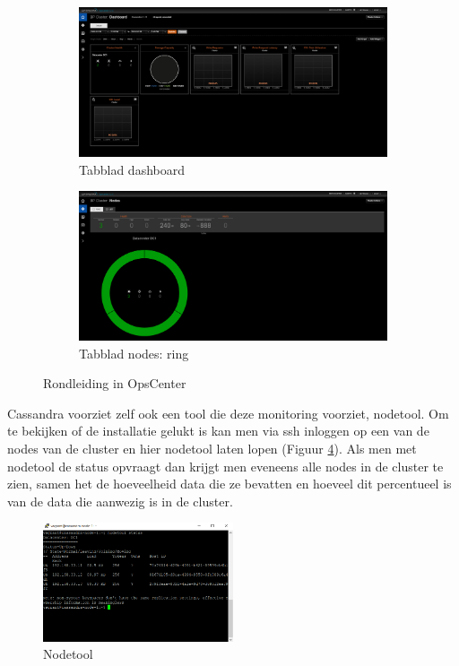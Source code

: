 \begin{figure}[H]
	\centering
	\begin{subfigure}{.49\textwidth}
		\centering
		\includegraphics[width=.99\linewidth]{img/4_installatie_cassandra/2_Tour_1_Dashboard}
		\caption{Tabblad dashboard}
		\label{fig:cas_opscenter_tour_dashboard}
	\end{subfigure}
	\begin{subfigure}{.49\textwidth}
		\centering
		\includegraphics[width=.99\linewidth]{img/4_installatie_cassandra/2_Tour_2_Nodes}
		\caption{Tabblad nodes: ring}
		\label{fig:cas_opscenter_tour_nodes}
	\end{subfigure}
	\caption{Rondleiding in OpsCenter}
	\label{fig:cas_opscenter_tour}
\end{figure}

Cassandra voorziet zelf ook een tool die deze monitoring voorziet, nodetool.
Om te bekijken of de installatie gelukt is kan men via ssh inloggen op een van de nodes van de cluster en hier nodetool laten lopen (Figuur \ref{fig:cas_nodetool}).
Als men met nodetool de status opvraagt dan krijgt men eveneens alle nodes in de cluster te zien, samen het de hoeveelheid data die ze bevatten en hoeveel dit percentueel is van de data die aanwezig is in de cluster.

\begin{figure}[H]
	\centering
	\includegraphics[width=0.5\textwidth]{img/4_installatie_cassandra/3_Node_setup}
	\caption{Nodetool}
	\label{fig:cas_nodetool}
\end{figure}

